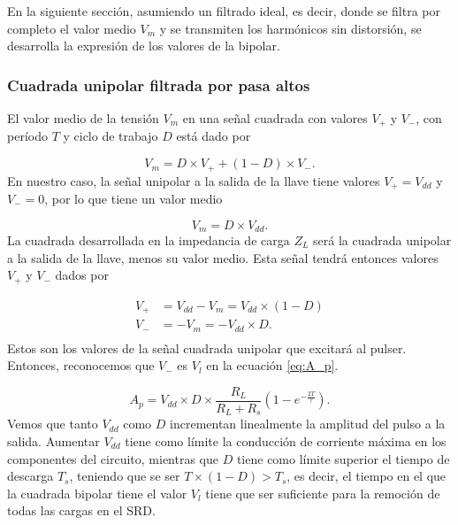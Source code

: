 En la siguiente sección, asumiendo un filtrado ideal, es decir, donde se filtra
por completo el valor medio $V_m$ y se transmiten los harmónicos sin distorsión,
se desarrolla la expresión de los valores de la bipolar.

\subsubsection{Cuadrada unipolar filtrada por pasa altos}

El valor medio de la tensión $V_m$ en una señal cuadrada con valores $V_+$ y
$V_-$, con período $T$ y ciclo de trabajo $D$ está dado por

\begin{equation}
    V_m = D \times V_+ + (1-D) \times V_-.
\end{equation}
En nuestro caso, la señal unipolar a la salida de la llave tiene valores
$V_+=V_{dd}$ y $V_-=0$, por lo que tiene un valor medio

\begin{equation}
    \label{eq:v_minus_ideal_load}
    V_m = D \times V_{dd}.
\end{equation}
La cuadrada desarrollada en la impedancia de carga $Z_L$ será la cuadrada
unipolar a la salida de la llave, menos su valor medio. Esta señal tendrá
entonces valores $V_+$ y $V_-$ dados por

\begin{equation}
    \label{eq:square_linear_load_highpassed_values}
    \begin{aligned}
        V_+ &= V_{dd}-V_m = V_{dd} \times (1-D) \\
        V_- &= -V_m = -V_{dd} \times D. \\
    \end{aligned}
\end{equation}
Estos son los valores de la señal cuadrada unipolar que excitará al pulser.
Entonces, reconocemos que $V_-$ es $V_l$ en la ecuación \ref{eq:A_p}.

\begin{equation}
    A_p = V_{dd} \times D \times \frac{R_L}{R_L+R_s} \left(
    1-e^{-\frac{2T}{\tau}}\right).
\end{equation}
Vemos que tanto $V_{dd}$ como $D$ incrementan linealmente la amplitud del pulso
a la salida. Aumentar $V_{dd}$ tiene como límite la conducción de corriente
máxima en los componentes del circuito, mientras que $D$ tiene como límite
superior el tiempo de descarga $T_s$, teniendo que se ser $T\times(1-D) > T_s$,
es decir, el tiempo en el que la cuadrada bipolar tiene el valor $V_l$ tiene que
ser suficiente para la remoción de todas las cargas en el SRD.

